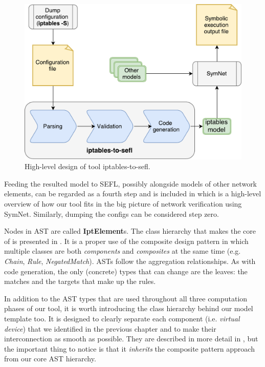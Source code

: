 \begin{figure}[h]
  \centering
  \captionsetup{justification=centering}
  \includegraphics[scale=0.5]{src/img/high-level-design}
  \caption{High-level design of tool iptables-to-sefl.}
  \label{fig:high-level-design}
\end{figure}

Feeding the resulted model to SEFL, possibly alongside models of other network
elements, can be regarded as a fourth step and is included in
 which is a high-level overview of
how our tool fits in the big picture of network verification using SymNet.
Similarly, dumping the configs can be considered step zero.

Nodes in AST are called \textbf{IptElement}s.  The class hierarchy that makes
the core of \TOOL is presented in .
It is a proper use of the composite design pattern in which multiple classes
are both \emph{components} and \emph{composites} at the same time (e.g.
\emph{Chain}, \emph{Rule}, \emph{NegatedMatch}).  ASTs follow the aggregation
relationships.  As with code generation, the only (concrete) types that can
change are the leaves: the matches and the targets that make up the rules.

In addition to the AST types that are used throughout all three computation
phases of our tool, it is worth introducing the class hierarchy behind our
model template too.  It is designed to clearly separate each component (i.e.
\emph{virtual device}) that we identified in the previous chapter and to make
their interconnection as smooth as possible. They are described in more detail
in , but the important thing to notice is
that it \emph{inherits} the composite pattern approach from our core AST
hierarchy.

